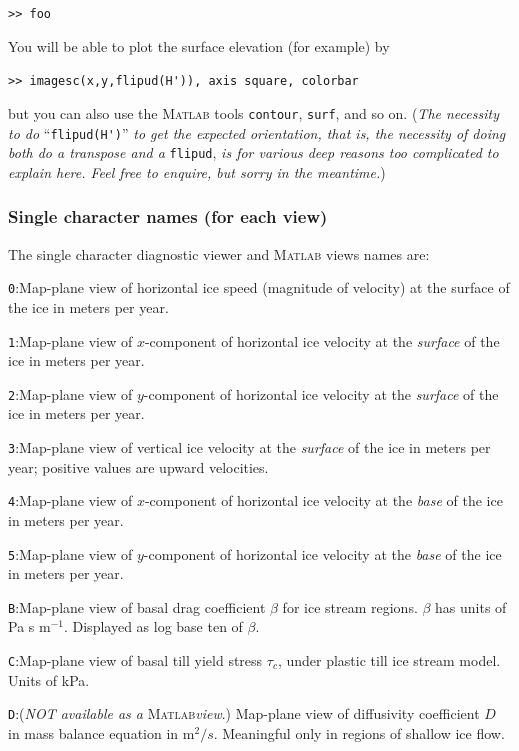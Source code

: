 \documentclass[11pt,final]{amsart}
\newcommand{\Matlab}{\textsc{Matlab}\xspace}
\begin{document}
\verb|>> foo|

\noindent You will be able to plot the surface elevation (for example) by

\verb|>> imagesc(x,y,flipud(H')), axis square, colorbar|

\noindent but you can also use the \Matlab tools \verb|contour|, \verb|surf|, and so on.  (\emph{The necessity to do} ``\verb|flipud(H')|'' \emph{to get the expected orientation, that is, the necessity of doing both do a transpose \emph{and} a} \verb|flipud|, \emph{is for various deep reasons too complicated to explain here.  Feel free to enquire, but \emph{sorry} in the meantime.})


\subsubsection*{Single character names (for each view)}  The single character diagnostic viewer and \Matlab views names are:
\newcommand{\notMat}{(\emph{NOT available as a} \Matlab \emph{view}.)\xspace\xspace}

\verb|0|:\quad Map-plane view of horizontal ice speed (magnitude of velocity) at the surface of the ice in meters per year.

\verb|1|:\quad Map-plane view of $x$-component of horizontal ice velocity at the \emph{surface} of the ice in meters per year.

\verb|2|:\quad Map-plane view of $y$-component of horizontal ice velocity at the \emph{surface} of the ice in meters per year.

\verb|3|:\quad Map-plane view of vertical ice velocity at the \emph{surface} of the ice in meters per year; positive values are upward velocities.

\verb|4|:\quad Map-plane view of $x$-component of horizontal ice velocity at the \emph{base} of the ice in meters per year.

\verb|5|:\quad Map-plane view of $y$-component of horizontal ice velocity at the \emph{base} of the ice in meters per year.

\verb|B|:\quad Map-plane view of basal drag coefficient $\beta$ for ice stream regions.  $\beta$ has units of Pa s $\text{m}^{-1}$.  Displayed as log base ten of $\beta$.

\verb|C|:\quad Map-plane view of basal till yield stress $\tau_c$, under plastic till ice stream model.  Units of kPa.

\verb|D|:\quad \notMat Map-plane view of diffusivity coefficient $D$ in mass balance equation in $\text{m}^2/s$.  Meaningful only in regions of shallow ice flow.
\end{document}
